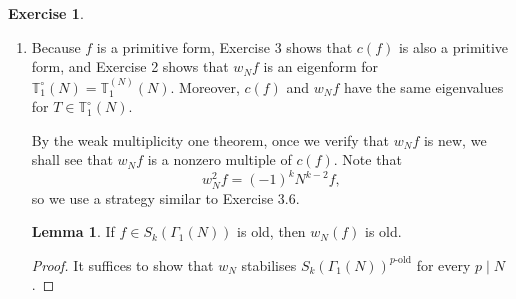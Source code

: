 \documentclass{article}
\theoremstyle{definition}
\newtheorem{example}{Exercise}
\newtheorem{lemma}{Lemma}
\theoremstyle{remark}
\newcommand{\old}{\mathrm{old}}
\begin{document}
\begin{example}
\begin{enumerate}
\item Because $f$ is a primitive form,
Exercise 3 shows that $c(f)$ is also a primitive form,
and Exercise 2 shows that $w_Nf$ is an eigenform for $\mathbb{T}_1^\circ(N) = \mathbb{T}_1^{(N)}(N)$.
Moreover, $c(f)$ and $w_Nf$
have the same eigenvalues for $T\in \mathbb{T}_1^\circ(N)$.

By the weak multiplicity one theorem,
once we verify that $w_Nf$ is new,
we shall see that $w_Nf$ is a nonzero multiple of $c(f)$.
Note that
\[w_N^2f = (-1)^kN^{k-2}f,\] so we use a strategy similar to Exercise 3.6.
\begin{lemma}\label{w_N preserves old}
    If $f\in S_k(\Gamma_1(N))$ is old, then $w_N(f)$ is old.
\end{lemma}
\begin{proof}
    It suffices to show that $w_N$ stabilises $S_k(\Gamma_1(N))^{p\text{-}\old}$ for every $p\mid N$.


\end{proof}
\end{enumerate}
\end{example}
\end{document}
